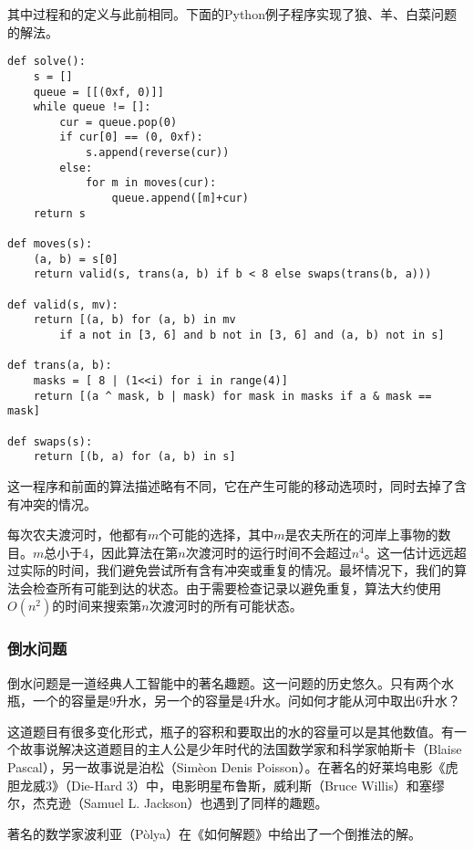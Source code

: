 \documentclass[UTF8]{article}
\begin{document}
其中过程和的定义与此前相同。下面的Python例子程序实现了狼、羊、白菜问题的解法。

\lstset{language=Python}
\begin{lstlisting}
def solve():
    s = []
    queue = [[(0xf, 0)]]
    while queue != []:
        cur = queue.pop(0)
        if cur[0] == (0, 0xf):
            s.append(reverse(cur))
        else:
            for m in moves(cur):
                queue.append([m]+cur)
    return s

def moves(s):
    (a, b) = s[0]
    return valid(s, trans(a, b) if b < 8 else swaps(trans(b, a)))

def valid(s, mv):
    return [(a, b) for (a, b) in mv
        if a not in [3, 6] and b not in [3, 6] and (a, b) not in s]

def trans(a, b):
    masks = [ 8 | (1<<i) for i in range(4)]
    return [(a ^ mask, b | mask) for mask in masks if a & mask == mask]

def swaps(s):
    return [(b, a) for (a, b) in s]
\end{lstlisting}

这一程序和前面的算法描述略有不同，它在产生可能的移动选项时，同时去掉了含有冲突的情况。

每次农夫渡河时，他都有$m$个可能的选择，其中$m$是农夫所在的河岸上事物的数目。$m$总小于4，因此算法在第$n$次渡河时的运行时间不会超过$n^4$。这一估计远远超过实际的时间，我们避免尝试所有含有冲突或重复的情况。最坏情况下，我们的算法会检查所有可能到达的状态。由于需要检查记录以避免重复，算法大约使用$O(n^2)$的时间来搜索第$n$次渡河时的所有可能状态。

\subsubsection{倒水问题}

倒水问题是一道经典人工智能中的著名趣题。这一问题的历史悠久。只有两个水瓶，一个的容量是9升水，另一个的容量是4升水。问如何才能从河中取出6升水？

这道题目有很多变化形式，瓶子的容积和要取出的水的容量可以是其他数值。有一个故事说解决这道题目的主人公是少年时代的法国数学家和科学家帕斯卡（Blaise Pascal），另一故事说是泊松（Sim\`{e}on Denis Poisson）。在著名的好莱坞电影《虎胆龙威3》（Die-Hard 3）中，电影明星布鲁斯，威利斯（Bruce Willis）和塞缪尔，杰克逊（Samuel L. Jackson）也遇到了同样的趣题。

著名的数学家波利亚（P\`{o}lya）在《如何解题》中给出了一个倒推法的解\cite{how-to-solve-it}。
\end{document}
